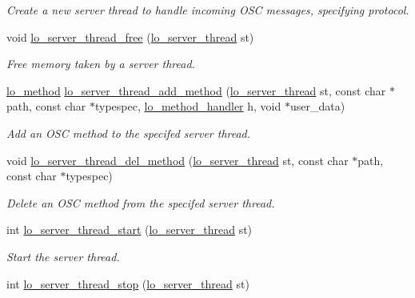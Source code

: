 \begin{DoxyCompactItemize}
\begin{DoxyCompactList}\small\item\em \-Create a new server thread to handle incoming \-O\-S\-C messages, specifying protocol. \end{DoxyCompactList}\item 
void \hyperlink{group__liblo_gad72be3f2a81b9583ad69dd007080c0e5}{lo\-\_\-server\-\_\-thread\-\_\-free} (\hyperlink{lo__types_8h_a09996ffb6bde21b8fb6106897b88feae}{lo\-\_\-server\-\_\-thread} st)
\begin{DoxyCompactList}\small\item\em \-Free memory taken by a server thread. \end{DoxyCompactList}\item 
\hyperlink{lo__types_8h_a66faedf5da13231d8c0166870477dce5}{lo\-\_\-method} \hyperlink{group__liblo_gacff9c90a8efc400448276b2d20831010}{lo\-\_\-server\-\_\-thread\-\_\-add\-\_\-method} (\hyperlink{lo__types_8h_a09996ffb6bde21b8fb6106897b88feae}{lo\-\_\-server\-\_\-thread} st, const char $\ast$path, const char $\ast$typespec, \hyperlink{lo__types_8h_a3b1c86c0925d05e13b5438ce8fe80a6c}{lo\-\_\-method\-\_\-handler} h, void $\ast$user\-\_\-data)
\begin{DoxyCompactList}\small\item\em \-Add an \-O\-S\-C method to the specifed server thread. \end{DoxyCompactList}\item 
void \hyperlink{group__liblo_ga072edf53338bc807444c4b510643a828}{lo\-\_\-server\-\_\-thread\-\_\-del\-\_\-method} (\hyperlink{lo__types_8h_a09996ffb6bde21b8fb6106897b88feae}{lo\-\_\-server\-\_\-thread} st, const char $\ast$path, const char $\ast$typespec)
\begin{DoxyCompactList}\small\item\em \-Delete an \-O\-S\-C method from the specifed server thread. \end{DoxyCompactList}\item 
int \hyperlink{group__liblo_ga4b284c1b96d0354c5de4ff7ba5a44fbc}{lo\-\_\-server\-\_\-thread\-\_\-start} (\hyperlink{lo__types_8h_a09996ffb6bde21b8fb6106897b88feae}{lo\-\_\-server\-\_\-thread} st)
\begin{DoxyCompactList}\small\item\em \-Start the server thread. \end{DoxyCompactList}\item 
int \hyperlink{group__liblo_ga06992ac46b04e58cb77d7c519a578f57}{lo\-\_\-server\-\_\-thread\-\_\-stop} (\hyperlink{lo__types_8h_a09996ffb6bde21b8fb6106897b88feae}{lo\-\_\-server\-\_\-thread} st)

\end{DoxyCompactItemize}
